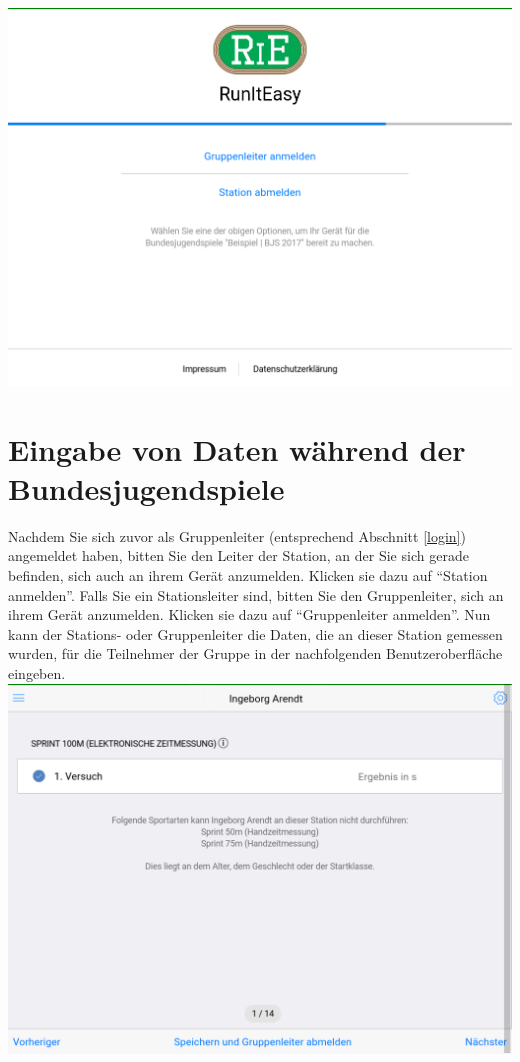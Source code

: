 \documentclass[11pt,a4paper,titlepage,german]{article}
\begin{document}
			\includegraphics[width=\textwidth]{LoggedIn-Station}
			
		\section[Datenerfassung]{Eingabe von Daten während der Bundesjugendspiele}
			Nachdem Sie sich zuvor als Gruppenleiter (entsprechend Abschnitt \ref{login}) angemeldet haben, bitten Sie den Leiter der Station, an der Sie sich gerade befinden, sich auch an ihrem Gerät anzumelden. Klicken sie dazu auf “Station anmelden”. Falls Sie ein Stationsleiter sind, bitten Sie den Gruppenleiter, sich an ihrem Gerät anzumelden. Klicken sie dazu auf “Gruppenleiter anmelden”.
			Nun kann der Stations- oder Gruppenleiter die Daten, die an dieser Station gemessen wurden, für die Teilnehmer der Gruppe in der nachfolgenden Benutzeroberfläche eingeben.\\
			\includegraphics[width=\textwidth]{InputData}
			
\end{document}
